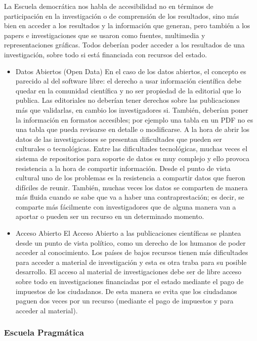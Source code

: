 		La Escuela democrática nos habla de accesibilidad no en términos de participación en la investigación o de comprensión de los resultados, sino más bien en acceder a los resultados y la información que generan, pero también a los papers e investigaciones que se usaron como fuentes, multimedia y representaciones gráficas. Todos deberían poder acceder a los resultados de una investigación, sobre todo si está financiada con recursos del estado.
	\begin{itemize}
		\item{Datos Abiertos (Open Data)}
		En el caso de los datos abiertos, el concepto es parecido al del software libre: el derecho a usar información científica debe quedar en la comunidad científica y no ser propiedad de la editorial que lo publica. Las editoriales no deberían tener derechos sobre las publicaciones más que validarlas, en cambio los investigadores si. También, deberían poner la información en formatos accesibles; por ejemplo una tabla en un PDF no es una tabla que pueda revisarse en detalle o modificarse. A la hora de abrir los datos de las investigaciones se presentan dificultades que pueden ser culturales o tecnológicas. Entre las dificultades tecnológicas, muchas veces el sistema de repositorios para soporte de datos es muy complejo y ello provoca resistencia a la hora de compartir información. Desde el punto de vista cultural uno de los problemas es la resistencia a compartir datos que fueron difíciles de reunir. También, muchas veces los datos se comparten de manera más fluida cuando se sabe que va a haber una contraprestación; es decir, se comparte más fácilmente con investigadores que de alguna manera van a aportar o pueden ser un recurso en un determinado momento.
		\item{Acceso Abierto}		
		El Acceso Abierto a las publicaciones científicas se plantea desde un punto de vista político, como un derecho de los humanos de poder acceder al conocimiento. Los países de bajos recursos tienen más dificultades para acceder a material de investigación y esta es otra traba para su posible desarrollo. El acceso al material de investigaciones debe ser de libre acceso sobre todo en investigaciones financiadas por el estado mediante el pago de impuestos de los ciudadanos. De esta manera se evita que los ciudadanos paguen dos veces por un recurso (mediante el pago de impuestos y para acceder al material).
		\end{itemize}

\subsubsection{Escuela Pragmática}
	
